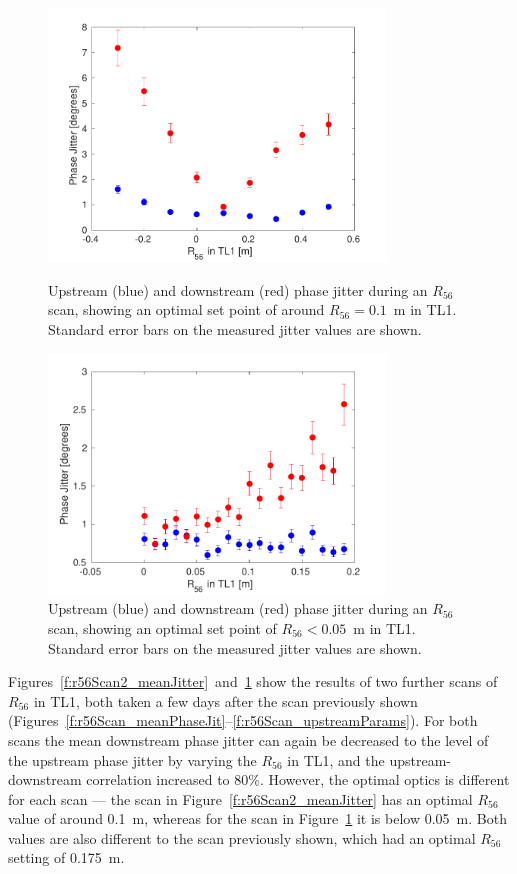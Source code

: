 \begin{figure}
  \centering
  \includegraphics[width=0.8\textwidth]{Figures/propagation/r56Scan2_meanJitter}
  \caption{Upstream (blue) and downstream (red) phase jitter during an \(R_{56}\) scan, showing an optimal set point of around \(R_{56}=0.1\)~m in TL1. Standard error bars on the measured jitter values are shown.}
  \label{f:r56Scan2_meanJitter}
  \includegraphics[width=0.8\textwidth]{Figures/propagation/r56Scan3_meanJitter}
  \caption{Upstream (blue) and downstream (red) phase jitter during an \(R_{56}\) scan, showing an optimal set point of \(R_{56}<0.05\)~m in TL1. Standard error bars on the measured jitter values are shown.}
  \label{f:r56Scan3_meanJitter}
\end{figure}


Figures~\ref{f:r56Scan2_meanJitter}~and~\ref{f:r56Scan3_meanJitter} show the results of two further scans of \(R_{56}\) in TL1, both taken a few days after the scan previously shown (Figures~\ref{f:r56Scan_meanPhaseJit}--\ref{f:r56Scan_upstreamParams}). For both scans the mean downstream phase jitter can again be decreased to the level of the upstream phase jitter by varying the \(R_{56}\) in TL1, and the upstream-downstream correlation increased to 80\%. However, the optimal optics is different for each scan --- the scan in Figure~\ref{f:r56Scan2_meanJitter} has an optimal \(R_{56}\) value of around 0.1~m, whereas for the scan in Figure~\ref{f:r56Scan3_meanJitter} it is below 0.05~m. Both values are also different to the scan previously shown, which had an optimal \(R_{56}\) setting of 0.175~m.


